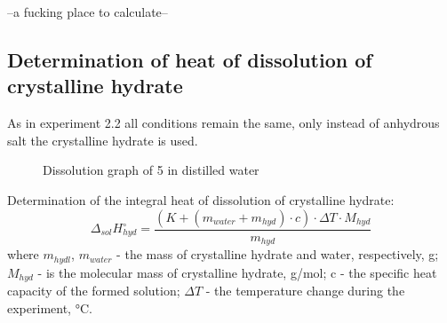 \documentclass[12pt, letterpaper]{article}
\begin{document}
        --a fucking place to calculate--
       


        \subsection{Determination of heat of dissolution of crystalline hydrate}
        As in experiment 2.2 all conditions remain the same, only instead of anhydrous salt the crystalline hydrate is used.
        \begin{figure}[h]
            \centering
             \caption{Dissolution graph of 5  in distilled water}
        \end{figure}
        Determination of the integral heat of dissolution of crystalline hydrate:
         \begin{equation}
            \Delta_{sol}H^\circ_{hyd} = \frac{(K + (m_{water} + m_{hyd}) \cdot c) \cdot \Delta T \cdot M_{hyd}}{m_{hyd}}
        \end{equation}
         where $ m_{hydl}$, $m_{water}$ - the mass of crystalline hydrate  and water, respectively, g; $M_{hyd}$ - is the molecular mass of crystalline hydrate, g/mol; c - the specific heat capacity of the formed solution; $\Delta T$ - the temperature change during the experiment, °C. \\
\end{document}
